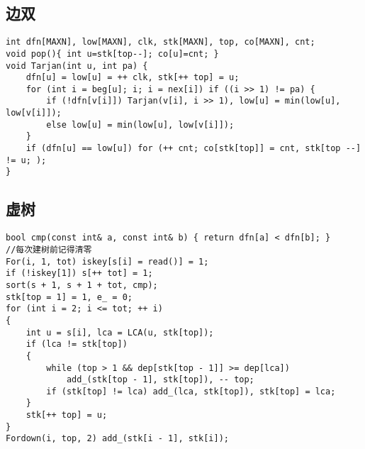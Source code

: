 \documentclass[twocolumn,a4]{article}
\begin{document}
\subsection{边双}
\begin{lstlisting}
int dfn[MAXN], low[MAXN], clk, stk[MAXN], top, co[MAXN], cnt;
void pop(){ int u=stk[top--]; co[u]=cnt; }
void Tarjan(int u, int pa) {
    dfn[u] = low[u] = ++ clk, stk[++ top] = u;
    for (int i = beg[u]; i; i = nex[i]) if ((i >> 1) != pa) {
        if (!dfn[v[i]]) Tarjan(v[i], i >> 1), low[u] = min(low[u], low[v[i]]);
        else low[u] = min(low[u], low[v[i]]);
    }
    if (dfn[u] == low[u]) for (++ cnt; co[stk[top]] = cnt, stk[top --] != u; );
}
\end{lstlisting}
\subsection{虚树}
\begin{lstlisting}
bool cmp(const int& a, const int& b) { return dfn[a] < dfn[b]; }
//每次建树前记得清零
For(i, 1, tot) iskey[s[i] = read()] = 1;
if (!iskey[1]) s[++ tot] = 1;
sort(s + 1, s + 1 + tot, cmp);
stk[top = 1] = 1, e_ = 0;
for (int i = 2; i <= tot; ++ i)
{
    int u = s[i], lca = LCA(u, stk[top]);
    if (lca != stk[top])
    {
        while (top > 1 && dep[stk[top - 1]] >= dep[lca])
            add_(stk[top - 1], stk[top]), -- top;
        if (stk[top] != lca) add_(lca, stk[top]), stk[top] = lca;
    }
    stk[++ top] = u;
}
Fordown(i, top, 2) add_(stk[i - 1], stk[i]);
\end{lstlisting}
\end{document}
